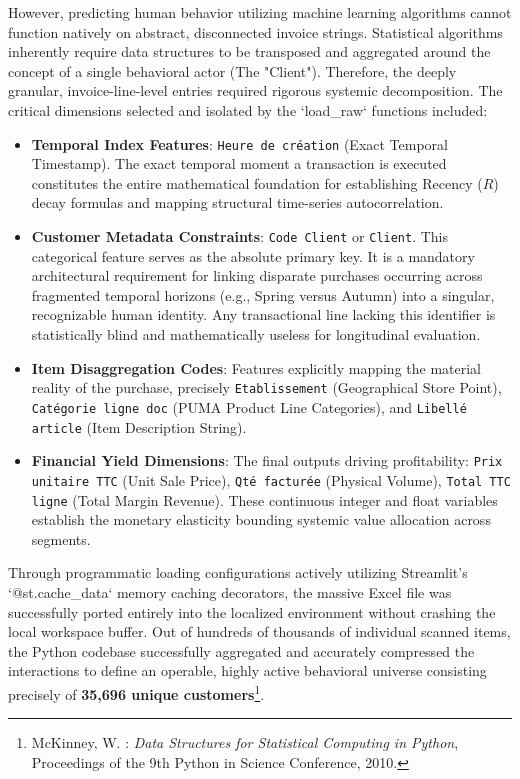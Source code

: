 \documentclass[12pt,a4paper]{report}
\begin{document}
However, predicting human behavior utilizing machine learning algorithms cannot function natively on abstract, disconnected invoice strings. Statistical algorithms inherently require data structures to be transposed and aggregated around the concept of a single behavioral actor (The "Client"). Therefore, the deeply granular, invoice-line-level entries required rigorous systemic decomposition. The critical dimensions selected and isolated by the `load_raw` functions included:
\begin{itemize}
    \item \textbf{Temporal Index Features}: \texttt{Heure de création} (Exact Temporal Timestamp). The exact temporal moment a transaction is executed constitutes the entire mathematical foundation for establishing Recency ($R$) decay formulas and mapping structural time-series autocorrelation.
    \item \textbf{Customer Metadata Constraints}: \texttt{Code Client} or \texttt{Client}. This categorical feature serves as the absolute primary key. It is a mandatory architectural requirement for linking disparate purchases occurring across fragmented temporal horizons (e.g., Spring versus Autumn) into a singular, recognizable human identity. Any transactional line lacking this identifier is statistically blind and mathematically useless for longitudinal evaluation.
    \item \textbf{Item Disaggregation Codes}: Features explicitly mapping the material reality of the purchase, precisely \texttt{Etablissement} (Geographical Store Point), \texttt{Catégorie ligne doc} (PUMA Product Line Categories), and \texttt{Libellé article} (Item Description String). 
    \item \textbf{Financial Yield Dimensions}: The final outputs driving profitability: \texttt{Prix unitaire TTC} (Unit Sale Price), \texttt{Qté facturée} (Physical Volume), \texttt{Total TTC ligne} (Total Margin Revenue). These continuous integer and float variables establish the monetary elasticity bounding systemic value allocation across segments.
\end{itemize}

Through programmatic loading configurations actively utilizing Streamlit's `@st.cache_data` memory caching decorators, the massive Excel file was successfully ported entirely into the localized environment without crashing the local workspace buffer. Out of hundreds of thousands of individual scanned items, the Python codebase successfully aggregated and accurately compressed the interactions to define an operable, highly active behavioral universe consisting precisely of \textbf{35,696 unique customers}\footnote{McKinney, W. : \textit{Data Structures for Statistical Computing in Python}, Proceedings of the 9th Python in Science Conference, 2010.}.
\end{document}
